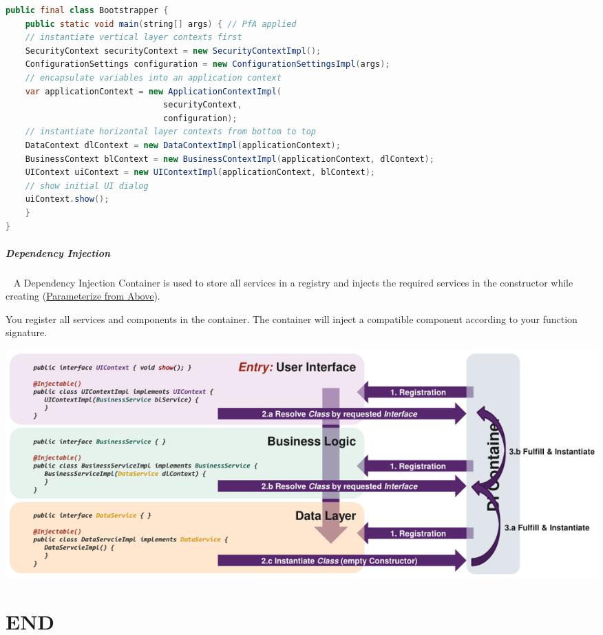 \documentclass[11pt,twoside,landscape]{article}
\begin{document}
\begin{multicols}{3}
\begin{lstlisting}[language=java,label=lst:example-for-parameteriz-from-above,caption={Example for Parameteriz from Above},captionpos=b,numbers=none]
public final class Bootstrapper {
    public static void main(string[] args) { // PfA applied
	// instantiate vertical layer contexts first
	SecurityContext securityContext = new SecurityContextImpl();
	ConfigurationSettings configuration = new ConfigurationSettingsImpl(args);
	// encapsulate variables into an application context
	var applicationContext = new ApplicationContextImpl(
							    securityContext,
							    configuration);
	// instantiate horizontal layer contexts from bottom to top
	DataContext dlContext = new DataContextImpl(applicationContext);
	BusinessContext blContext = new BusinessContextImpl(applicationContext, dlContext);
	UIContext uiContext = new UIContextImpl(applicationContext, blContext);
	// show initial UI dialog
	uiContext.show();
    }
}
\end{lstlisting}
\subparagraph{Dependency Injection} \
\label{sec:orgba08751}
A Dependency Injection Container is used to store all services in a registry and injects the required services in the constructor while creating (\href{../../../roam/20230125163949-how_to_share_classes_over_multiple_layers.org}{Parameterize from Above}).

You register all services and components in the container.
The container will inject a compatible component according to your function signature.


{
\begin{center}
\includegraphics[width=.9\linewidth]{img/dependency_injection_example.png}
\end{center}
\label{fig:dependency-injection-example}
}
\section{END}
\label{sec:org2cda378}
\end{multicols}
\end{document}
